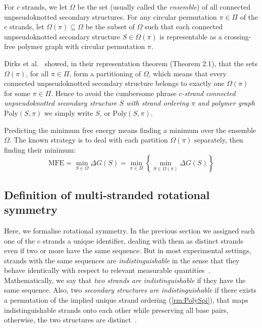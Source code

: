 \documentclass[11pt,letterpaper]{article}  \usepackage[margin=1in]{geometry}
\theoremstyle{definition}  \newtheorem{Definition}[theorem]{Definition}
\newcommand{\PolySpi}{\ensuremath{\mathrm{Poly}(S,\pi)}\xspace}
\begin{document}
For $c$ strands, we let $\Omega$ be the set  (usually called the {\em ensemble}) of all  connected unpseudoknotted secondary structures. 
For any circular permutation $\pi \in \Pi$ of the $c$ strands, let $\Omega(\pi) \subseteq \Omega$ be the subset of $\Omega$ such that each connected unpseudoknotted secondary structure $S\in \Omega(\pi)$ is representable as a crossing-free polymer graph with circular permutation $\pi$. 


\begin{remark}[$S$, or $\PolySpi$]\label{rm:PolySpi}
	Dirks et al.~\cite{dirks2007thermodynamic} showed, in their representation theorem (Theorem 2.1), that the sets $\Omega(\pi)$, for all $\pi \in \Pi$, form a partitioning of $\Omega$, which means that every connected unpseudoknotted secondary structure belongs to exactly one $\Omega(\pi)$ for some $\pi \in \Pi$. 
	Hence to avoid the cumbersome phrase 
	{\em $c$-strand connected unpseudoknotted secondary structure $S$ with strand ordering $\pi$ and polymer graph $\PolySpi$}
	we simply write $S$, or $\PolySpi$.
\end{remark}



Predicting the minimum free energy means finding a minimum over the ensemble $\Omega$. 
The known strategy is to deal with each partition $\Omega(\pi)$ separately,  
then finding their minimum:  
\begin{equation}\label{eq:MFE}
	\textrm{MFE} = \min_{S \in \Omega} \Delta G(S)  =\min\limits_{\pi \in \Pi} \left\{ \min_{S \in \Omega(\pi)} \Delta G(S) \right\}  
\end{equation}

\subsection{Definition of multi-stranded rotational symmetry} \label{sec:sym}

Here, we formalise rotational symmetry. 
In the previous section we assigned each one of the $c$ strands a unique identifier, dealing with them as distinct strands even if two or more have the same sequence. 
But in most experimental settings, strands with the same sequences are \emph{indistinguishable}   in the sense that they behave identically with respect to relevant measurable quantities~\cite{dirks2007thermodynamic}. 
Mathematically, we say that {\em two strands are  indistinguishable} if they have the same sequence. 
Also, two \emph{secondary structures are indistinguishable} if there exists a permutation of the implied unique strand ordering (\cref{rm:PolySpi}), 
that maps indistinguishable strands onto each other while preserving all base pairs, otherwise, the two structures are distinct~\cite{dirks2007thermodynamic}.
\end{document}
